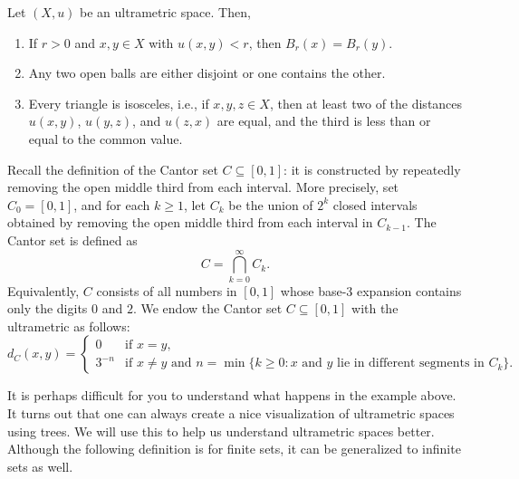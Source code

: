 \begin{proposition}
  Let $(X,u)$ be an ultrametric space. Then,
\begin{enumerate}
  \item If $r>0$ and $x,y\in X$ with $u(x,y)<r$, then $B_r(x)=B_r(y)$.
  \item Any two open balls are either disjoint or one contains the other.
  \item Every triangle is isosceles, i.e., if $x,y,z\in X$, then at least two of the distances $u(x,y)$, $u(y,z)$, and $u(z,x)$ are equal, and the third is less than or equal to the common value.
\end{enumerate}
\end{proposition}

\begin{example}
  Recall the definition of the Cantor set $C\subseteq [0,1]$: it is constructed by repeatedly removing the open middle third from each interval. More precisely, set $C_0 = [0,1]$, and for each $k\ge 1$, let $C_k$ be the union of $2^k$ closed intervals obtained by removing the open middle third from each interval in $C_{k-1}$. The Cantor set is defined as
  \[
  C = \bigcap_{k=0}^\infty C_k.
  \]
  Equivalently, $C$ consists of all numbers in $[0,1]$ whose base-3 expansion contains only the digits $0$ and $2$.
  We endow the Cantor set $C\subseteq [0,1]$ with the ultrametric as follows:
  \[
  d_C(x,y) =
  \begin{cases}
  0 & \text{if } x=y,\\[1ex]
  3^{-n} & \text{if } x\neq y \text{ and } n = \min\{ k \ge 0 : \text{$x$ and $y$ lie in different segments in } C_k \}.
  \end{cases}
  \]
\end{example}

It is perhaps difficult for you to understand what happens in the example above. It turns out that one can always create a nice visualization of ultrametric spaces using trees. We will use this to help us understand ultrametric spaces better. Although the following definition is for finite sets, it can be generalized to infinite sets as well.

\newpage

